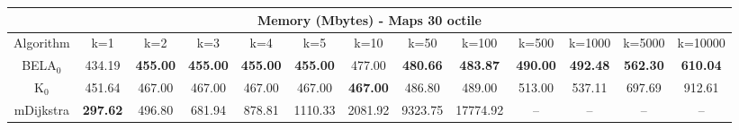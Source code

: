 \begin{tabular}{c|cccccccccccc}\toprule
\multicolumn{13}{c}{Memory (Mbytes) - Maps 30 octile}\\ \midrule
Algorithm & k=1 & k=2 & k=3 & k=4 & k=5 & k=10 & k=50 & k=100 & k=500 & k=1000 & k=5000 & k=10000 \\ \midrule
BELA$_0$ & 434.19 & \textbf{455.00} & \textbf{455.00} & \textbf{455.00} & \textbf{455.00} & 477.00 & \textbf{480.66} & \textbf{483.87} & \textbf{490.00} & \textbf{492.48} & \textbf{562.30} & \textbf{610.04} \\
K$_0$ & 451.64 & 467.00 & 467.00 & 467.00 & 467.00 & \textbf{467.00} & 486.80 & 489.00 & 513.00 & 537.11 & 697.69 & 912.61 \\
mDijkstra & \textbf{297.62} & 496.80 & 681.94 & 878.81 & 1110.33 & 2081.92 & 9323.75 & 17774.92 & -- & -- & -- & -- \\ \bottomrule 
\end{tabular}
